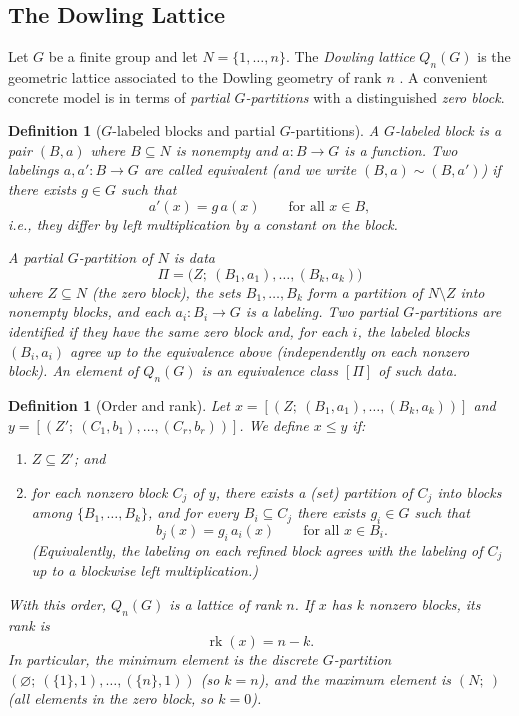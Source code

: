 \documentclass{article}
\newtheorem{definition}[theorem]{Definition}
\begin{document}
\subsection{The Dowling Lattice}

Let \(G\) be a finite group and let \(N=\{1,\dots,n\}\).
The \emph{Dowling lattice} \(Q_n(G)\) is the geometric lattice associated to the
Dowling geometry of rank \(n\) \citep{Dowling1973}.  A convenient concrete model
is in terms of \emph{partial \(G\)-partitions} with a distinguished \emph{zero block}.

\begin{definition}[\(G\)-labeled blocks and partial \(G\)-partitions]
A \emph{\(G\)-labeled block} is a pair \((B,a)\) where \(B\subseteq N\) is nonempty
and \(a:B\to G\) is a function. Two labelings \(a,a':B\to G\) are called
\emph{equivalent} (and we write \((B,a)\sim(B,a')\)) if there exists \(g\in G\) such that
\[
a'(x)=g\,a(x)\qquad \text{for all }x\in B,
\]
i.e., they differ by \emph{left multiplication by a constant} on the block.

A \emph{partial \(G\)-partition} of \(N\) is data
\[
\Pi=\bigl(Z;\ (B_1,a_1),\dots,(B_k,a_k)\bigr)
\]
where \(Z\subseteq N\) (the \emph{zero block}), the sets \(B_1,\dots,B_k\) form a partition
of \(N\setminus Z\) into nonempty blocks, and each \(a_i:B_i\to G\) is a labeling.
Two partial \(G\)-partitions are identified if they have the same zero block and,
for each \(i\), the labeled blocks \((B_i,a_i)\) agree up to the equivalence above
(independently on each nonzero block).
An element of \(Q_n(G)\) is an equivalence class \([\Pi]\) of such data.
\end{definition}

\begin{definition}[Order and rank]
Let \(x=[(Z;\ (B_1,a_1),\dots,(B_k,a_k))]\) and
\(y=[(Z';\ (C_1,b_1),\dots,(C_r,b_r))]\).
We define \(x\le y\) if:
\begin{enumerate}
\item \(Z\subseteq Z'\); and
\item for each nonzero block \(C_j\) of \(y\), there exists a (set) partition of \(C_j\)
into blocks among \(\{B_1,\dots,B_k\}\), and for every \(B_i\subseteq C_j\) there exists
\(g_{i}\in G\) such that
\[
b_j(x)=g_i\,a_i(x)\qquad \text{for all }x\in B_i.
\]
(Equivalently, the labeling on each refined block agrees with the labeling of \(C_j\)
up to a blockwise left multiplication.)
\end{enumerate}
With this order, \(Q_n(G)\) is a lattice of rank \(n\). If \(x\) has \(k\) nonzero blocks,
its rank is
\[
\operatorname{rk}(x)=n-k.
\]
In particular, the minimum element is the discrete \(G\)-partition
\((\varnothing;\ (\{1\},1),\dots,(\{n\},1))\) (so \(k=n\)), and the maximum element is
\((N;\ )\) (all elements in the zero block, so \(k=0\)).
\end{definition}
\end{document}
